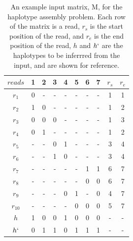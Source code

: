 \documentclass[10pt,twocolumn]{article}
\begin{document}
\begin{table}[h!]
\centering
\caption{An example input matrix, M, for the haplotype assembly problem. Each row of the matrix is a read, 
        $r_s$ is the start position of the read, and $r_e$ is the end position of the read, $h$ and $h`$ are
        the haplotypes to be inferrred from the input, and are shown for reference.}
        \vspace{0.2cm}
\label{tab:exinp}   
\begin{tabular}{c c c c c c c c c c}
    \hline 
    $reads$     & 1     & 2     & 3     & 4     & 5     & 6     & 7     & $r_s$     & $r_e$         \\
    \hline
    $r_1$       & 0     & -     & -     & -     & -     & -     & -     & 1         & 1             \\
    $r_2$       & 1     & 0     & -     & -     & -     & -     & -     & 1         & 2             \\
    $r_3$       & 0     & 0     & 0     & -     & -     & -     & -     & 1         & 3             \\
    $r_4$       & 0     & 1     & -     & -     & -     & -     & -     & 1         & 2             \\
    $r_5$       & -     & -     & 0     & 1     & -     & -     & -     & 3         & 4             \\
    $r_6$       & -     & -     & 1     & 0     & -     & -     & -     & 3         & 4             \\
    $r_7$       & -     & -     & -     & -     & -     & 1     & 1     & 6         & 7             \\
    $r_8$       & -     & -     & -     & -     & -     & 0     & 0     & 6         & 7             \\
    $r_9$       & -     & -     & -     & 0     & 1     & -     & 0     & 4         & 7             \\
    $r_10$      & -     & -     & -     & -     & 0     & 0     & 0     & 5         & 7             \\
    \hline                                                                                          
    \hline                                                                                          
    $h$         & 1     & 0     & 0     & 1     & 0     & 0     & 0     & -         & -               \\
    $h`$        & 0     & 1     & 1     & 0     & 1     & 1     & 1     & -         & -               \\
    \hline
\end{tabular}
\end{table}
\end{document}
